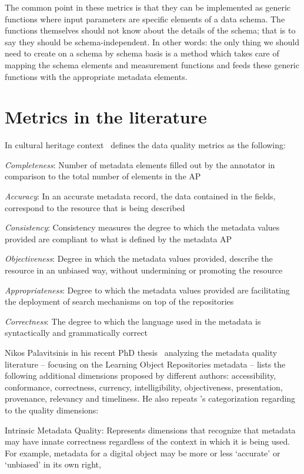 The common point in these metrics is that they can be implemented as generic functions where input parameters are specific elements of a data schema. The functions themselves should not know about the details of the schema; that is to say they should be schema-independent. In other words: the only thing we should need to create on a schema by schema basis is a method which takes care of mapping the schema elements and measurement functions and feeds these generic functions with the appropriate metadata elements.

\section{Metrics in the literature}

In cultural heritage context~\cite{bruce-hillmann2004} defines the data quality metrics as the following:

\emph{Completeness}: Number of metadata elements filled out by the annotator in comparison to the total number of elements in the AP

\emph{Accuracy}: In an accurate metadata record, the data contained in the fields, correspond to the resource that is being described

\emph{Consistency}: Consistency measures the degree to which the metadata values provided are compliant to what is defined by the metadata AP

\emph{Objectiveness}: Degree in which the metadata values provided, describe the resource in an unbiased way, without undermining or promoting the resource

\emph{Appropriateness}: Degree to which the metadata values provided are facilitating the deployment of search mechanisms on top of the repositories

\emph{Correctness}: The degree to which the language used in the metadata is syntactically and grammatically correct

Nikos Palavitsinis in his recent PhD thesis~\cite{palavitsinis2014} analyzing the metadata quality literature -- focusing on the Learning Object Repositories metadata -- lists the following additional dimensions proposed by different authors: accessibility, conformance, correctness, currency, intelligibility, objectiveness, presentation, provenance, relevancy and timeliness. He also repeats \cite{lee2002}’s categorization regarding to the quality dimensions:

Intrinsic Metadata Quality: Represents dimensions that recognize that metadata may have innate correctness regardless of the context in which it is being used. For example, metadata for a digital object may be more or less ‘accurate’ or ‘unbiased’ in its own right,

